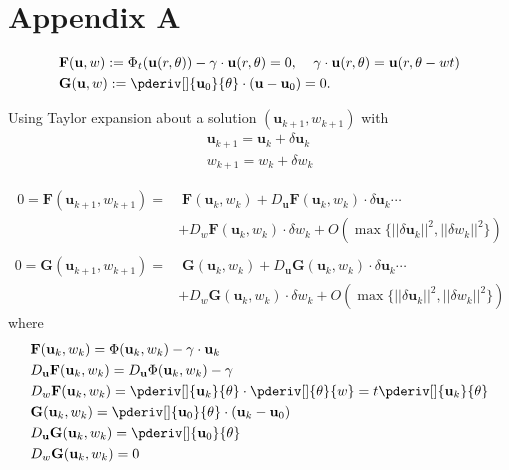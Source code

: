\chapter*{Appendix A}

\begin{align}
&\mathbf{F}(\mathbf{u},w):= \Phi_t(\mathbf{u}(r,\theta)) - \gamma\cdot\mathbf{u}(r,\theta) = 0, \;\;\;\;
\gamma\cdot\mathbf{u}(r,\theta) = \mathbf{u}(r,\theta-wt)\\
&\mathbf{G}(\mathbf{u},w):= \pderiv[]{\mathbf{u}_0}{\theta}\cdot(\mathbf{u}-\mathbf{u}_0) = 0.
\end{align}

Using Taylor expansion about a solution $(\mathbf{u}_{k+1},w_{k+1})$ with
\begin{equation}\begin{split}
\mathbf{u}_{k+1} =\mathbf{u}_{k} + \delta{\mathbf{u}_{k}}\\
w_{k+1} = w_{k} + \delta w_{k}
\end{split}\end{equation}

\begin{equation}\begin{aligned}
0 = \mathbf{F}(\mathbf{u}_{k+1},w_{k+1}) = &\;\mathbf{F}(\mathbf{u}_{k},w_{k}) +
D_\mathbf{u}\mathbf{F}(\mathbf{u}_{k},w_{k})\cdot\delta\mathbf{u}_{k}\cdots\\
&+ D_w\mathbf{F}(\mathbf{u}_{k},w_{k})\cdot\delta w_{k} + O(\max\{||\delta\mathbf{u}_{k}||^{2},||\delta w_{k}||^2\})\\
\end{aligned}\end{equation}
\begin{equation}\begin{aligned}
0 = \mathbf{G}(\mathbf{u}_{k+1},w_{k+1}) = &\;\mathbf{G}(\mathbf{u}_{k},w_{k}) +
D_\mathbf{u}\mathbf{G}(\mathbf{u}_{k},w_{k})\cdot\delta\mathbf{u}_{k} \cdots\\
&+ D_w\mathbf{G}(\mathbf{u}_{k},w_{k})\cdot\delta w_{k} + O(\max\{||\delta\mathbf{u}_{k}||^{2},||\delta w_{k}||^2\})
\end{aligned}\end{equation}
where
\begin{align}
&\mathbf{F}(\mathbf{u}_{k},w_{k}) = \Phi(\mathbf{u}_k,w_k) - \gamma\cdot\mathbf{u}_{k}\\
&D_\mathbf{u}\mathbf{F}(\mathbf{u}_{k},w_{k}) = D_\mathbf{u}\Phi(\mathbf{u}_{k},w_{k}) - \gamma\\
& D_w\mathbf{F}(\mathbf{u}_{k},w_{k}) = \pderiv[]{\mathbf{u}_k}{\theta}\cdot\pderiv[]{\theta}{w} = t\pderiv[]{\mathbf{u}_k}{\theta}\\
&\mathbf{G}(\mathbf{u}_{k},w_{k}) = \pderiv[]{\mathbf{u}_0}{\theta}\cdot(\mathbf{u}_{k}-\mathbf{u}_0)\\
&D_\mathbf{u}\mathbf{G}(\mathbf{u}_{k},w_{k}) = \pderiv[]{\mathbf{u}_0}{\theta}\\
& D_w\mathbf{G}(\mathbf{u}_{k},w_{k}) = 0
\end{align} 

